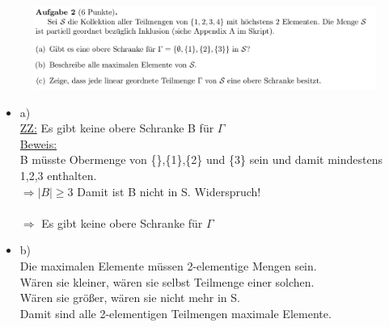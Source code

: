 \documentclass[a4paper]{scrartcl}
\begin{document}
    \begin{figure}[H]
        \centering
        \includegraphics[scale=0.3]{./A-2.png}
        \label{fig:}
    \end{figure}

    \begin{itemize}
        \item a)\\
            \underline{ZZ:} Es gibt keine obere Schranke B für $\Gamma$\\
            \underline{Beweis:}\\
                B müsste Obermenge von \{\},\{1\},\{2\} und \{3\} sein und damit mindestens 1,2,3 enthalten.\\
                $\Rightarrow |B| \geq 3$ Damit ist B nicht in S. Widerspruch!\\
                \\$\Rightarrow$ Es gibt keine obere Schranke für $\Gamma$\\

        \item b)\\
            Die maximalen Elemente müssen 2-elementige Mengen sein.\\
            Wären sie kleiner, wären sie selbst Teilmenge einer solchen.\\
            Wären sie größer, wären sie nicht mehr in S.\\
            Damit sind alle 2-elementigen Teilmengen maximale Elemente.\\

\newpage


\end{itemize}
\end{document}
